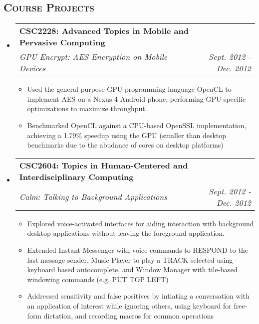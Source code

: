 \documentclass[letterpaper,11pt]{article}
\makeatletter
\newcommand{\company}[1]{
    \textbf{#1}
}
\newcommand{\heading}[1]{
    \textsc{\textbf{#1}}
}
\newcommand*\resheading[1]{\subsection*{\heading{#1}}\vspace{0.3em}\nopagebreak[4]}
\newcommand{\resitem}[1]{\item #1 \vspace{-2pt}}
\newcommand{\ressubheading}[4]{
\begin{tabular*}{6.5in}{l@{\extracolsep{\fill}}r}
    
		\company{#1} & #2 \\
		\textit{#3} & \textit{#4} \\
\end{tabular*}\vspace{-6pt}}
\makeatother
\begin{document}
\resheading{Course Projects}
\begin{itemize}

\item

	\ressubheading{CSC2228: Advanced Topics in Mobile and Pervasive Computing}{}{GPU Encrypt: AES Encryption on Mobile Devices}{Sept. 2012 - Dec. 2012}
	\begin{itemize}
		\resitem{
            Used the general purpose GPU programming language OpenCL to implement AES on a 
            Nexus 4 Android phone, performing GPU-specific optimizations to maximize 
            throughput.
        }
		\resitem{
            Benchmarked OpenCL against a CPU-based OpenSSL implementation, achieving a 
            1.79\% speedup using the GPU (smaller than desktop benchmarks due to the 
            abudance of cores on desktop platforms)
        }
	\end{itemize}

\item
	\ressubheading{CSC2604: Topics in Human-Centered and Interdisciplinary Computing}{}{Calm: Talking to Background Applications}{Sept. 2012 - Dec. 2012}
	\begin{itemize}
		\resitem{
            Explored voice-activated interfaces for aiding interaction with background 
            desktop applications without leaving the foreground application.
        }
		\resitem{
            Extended Instant Messenger with voice commands to RESPOND to the last message 
            sender, Music Player to play a TRACK selected using keyboard based 
            autocomplete, and Window Manager with tile-based windowing commands (e.g. PUT 
            TOP LEFT)
        }
		\resitem{
            Addressed sensitivity and false positives by intiating a conversation with an 
            application of interest while ignoring others, using keyboard for free-form 
            dictation, and recording macros for common operations
        }
	\end{itemize}

\end{itemize}
\end{document}
